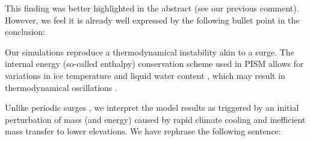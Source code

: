 
    This finding was better highlighted in the abstract (see our previous
    comment). However, we feel it is already well expressed by the following
    bullet point in the conclusion:



    Our simulations reproduce a thermodynamical instability akin to a surge.
    The internal energy (so-called enthalpy) conservation scheme used in PISM
    allows for variations in ice temperature and liquid water content
    \citep{Aschwanden.etal.2012}, which may result in thermodynamical
    oscillations \citep{Pelt.Oerlemans.2012, Feldmann.Levermann.2017}.

    Unlike periodic surges \citep[as described by, e.g.,][]{Sevestre.Benn.2015},
    we interpret the model results as triggered by an initial perturbation of
    mass (and energy) caused by rapid climate cooling and inefficient mass
    transfer to lower elevations. We have rephrase the following sentence:


